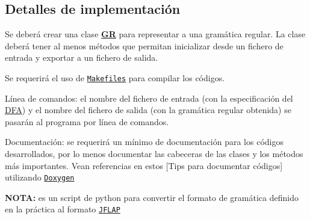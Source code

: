 \subsection*{Detalles de implementación}


\begin{DoxyItemize}
\item Se deberá crear una clase {\bfseries \mbox{\hyperlink{class_g_r}{GR}}} para representar a una gramática regular. La clase deberá tener al menos métodos que permitan inicializar desde un fichero de entrada y exportar a un fichero de salida.
\item Se requerirá el uso de \href{http://stackoverflow.com/questions/2481269/how-to-make-simple-c-makefile}{\tt Makefiles} para compilar los códigos.
\item Línea de comandos\+: el nombre del fichero de entrada (con la especificación del \mbox{\hyperlink{class_d_f_a}{D\+FA}}) y el nombre del fichero de salida (con la gramática regular obtenida) se pasarán al programa por línea de comandos.
\item Documentación\+: se requerirá un mínimo de documentación para los códigos desarrollados, por lo menos documentar las cabeceras de las clases y los métodos más importantes. Vean referencias en estos \mbox{[}Tips para documentar códigos\mbox{]} utilizando \href{http://www.doxygen.nl/index.html}{\tt Doxygen}
\end{DoxyItemize}

{\bfseries N\+O\+TA\+:}  es un script de python para convertir el formato de gramática definido en la práctica al formato \href{http://www.jflap.org}{\tt J\+F\+L\+AP} 